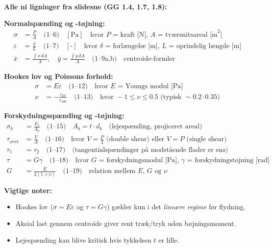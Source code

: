 \clearpage

\begin{eksambox}

\textbf{Alle ni ligninger fra slidesne (GG 1.4, 1.7, 1.8):}

\vspace{8pt}

\textbf{Normalspænding og -tøjning:}
\begin{align}
  \sigma &= \frac{P}{A} \quad \text{(1--6)} \quad [\text{Pa}] \quad \text{hvor } P \text{ = kraft [N], } A \text{ = tværsnitsareal [m}^2\text{]} \\
  \varepsilon &= \frac{\delta}{L} \quad \text{(1--7)} \quad [\text{-}] \quad \text{hvor } \delta \text{ = forlængelse [m], } L \text{ = oprindelig længde [m]} \\
  \bar{x} &= \frac{\int x \, dA}{A}, \quad \bar{y} = \frac{\int y \, dA}{A} \quad \text{(1--9a,b)} \quad \text{centroide-formler}
\end{align}

\textbf{Hookes lov og Poissons forhold:}
\begin{align}
  \sigma &= E\varepsilon \quad \text{(1--12)} \quad \text{hvor } E \text{ = Youngs modul [Pa]} \\
  \nu &= -\frac{\varepsilon_{\text{lat}}}{\varepsilon_{\text{aks}}} \quad \text{(1--13)} \quad \text{hvor } -1 \le \nu \le 0.5 \text{ (typisk } \sim 0.2\text{--}0.35\text{)}
\end{align}

\textbf{Forskydningsspænding og -tøjning:}
\begin{align}
  \sigma_b &= \frac{F_b}{A_b} \quad \text{(1--15)} \quad A_b = t \cdot d_b \quad \text{(lejespænding, projiceret areal)} \\
  \tau_{\text{aver}} &= \frac{V}{A} \quad \text{(1--16)} \quad \text{hvor } V = \frac{P}{2} \text{ (double shear) eller } V = P \text{ (single shear)} \\
  \tau_1 &= \tau_2 \quad \text{(1--17)} \quad \text{(tangentialspændinger på modstående flader er ens)} \\
  \tau &= G\gamma \quad \text{(1--18)} \quad \text{hvor } G \text{ = forskydningsmodul [Pa], } \gamma \text{ = forskydningstøjning [rad]} \\
  G &= \frac{E}{2(1+\nu)} \quad \text{(1--19)} \quad \text{relation mellem } E \text{, } G \text{ og } \nu
\end{align}

\textbf{Vigtige noter:}
\begin{itemize}
  \item Hookes lov ($\sigma = E\varepsilon$ og $\tau = G\gamma$) gælder kun i det \emph{lineære regime} før flydning.
  \item Aksial last gennem centroide giver rent træk/tryk uden bøjningsmoment.
  \item Lejespænding kan blive kritisk hvis tykkelsen $t$ er lille.
\end{itemize}

\end{eksambox}

